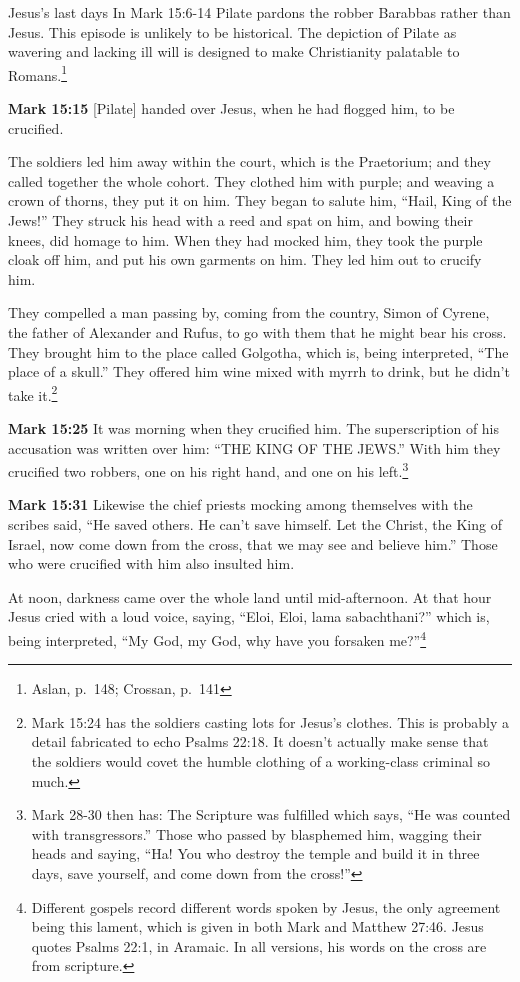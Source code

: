 \documentclass[10pt,twoside]{article} %
\newcommand{\doimage}[2]{\texttt{[image: \#2]}\label{fig:#2}}
\newcommand{\figbasic}[4]{ %
    \ifthenelse{\isodd{\pageref{fig:#2}}}{}{\hfill}
    \ifstrempty{#3}{
      \doimage{#1}{#2}
    }{
      \makebox{\doimage{#1}{#2} \\ #3}
    }
    \ifthenelse{\isodd{\pageref{fig:#2}}}{\hfill}{}
    \par
}
\newcommand{\fig}[2][0.4]{
  \figbasic{#1}{#2}{}{}
}
\newcommand{\quotesize}{\normalsize{}}
\newcommand{\comm}[1]{\begingroup \color{black!50} #1\endgroup}
\newenvironment{quotetext}{\begingroup\quotesize}{\endgroup}
\newcommand{\intex}[1]{\index[texts]{#1}}
\newcommand{\reftex}[1]{#1\intex{#1}}
\newcommand{\bible}[2]{\begin{quotetext}\textbf{#1}\intex{#1} #2\end{quotetext}}
\newcommand{\gospelmark}[2]{\bible{Mark #1}{#2}}
\begin{document}
\begin{section}{Jesus's last days}
\comm{In Mark 15:6-14 Pilate pardons the robber Barabbas rather than Jesus. This episode is unlikely to be historical.
The depiction of Pilate as wavering and lacking ill will is designed to make Christianity palatable to Romans.\footnote{Aslan, p.~148; Crossan,
p.~141}}

\fig{ecce-homo}

\gospelmark{15:15}{
[Pilate] handed over Jesus, when he had flogged him, to be crucified.

  The soldiers led him away within the court, which is the Praetorium; and they called together the whole cohort.   They clothed him with purple; and weaving a crown of thorns, they put it on him.   They began to salute him, ``Hail, King of the Jews!''   They struck his head with a reed and spat on him, and bowing their knees, did homage to him.   When they had mocked him, they took the purple cloak off him, and put his own garments on him. They led him out to crucify him.

  They compelled a man passing by, coming from the country, Simon of Cyrene, the father of Alexander and Rufus, to go with them that he might bear his cross.   They brought him to the place called Golgotha, which is, being interpreted, ``The place of a skull.''   They offered him wine mixed with myrrh to drink, but he didn't take it.\footnote{\reftex{Mark 15:24} has the soldiers casting lots for Jesus's clothes. This is probably a detail fabricated
to echo \reftex{Psalms 22:18}. It doesn't actually make sense that the soldiers would covet the humble clothing of a working-class criminal so much.}
}

\gospelmark{15:25}{
It was morning when they crucified him.   The superscription of his accusation was written over him: ``THE KING OF THE JEWS.''   With him they crucified two robbers, one on his right hand, and one on his left.\footnote{Mark 28-30 then has: The Scripture was fulfilled which says, 
``He was counted with transgressors.'' Those who passed by blasphemed him, wagging their heads and saying, ``Ha! You who destroy the temple and build it in three days,   save yourself, and come down from the cross!''}
}

\gospelmark{15:31}{
  Likewise the chief priests mocking among themselves with the scribes said, ``He saved others. He can't save himself.   Let the Christ, the King of Israel, now come down from the cross, that we may see and believe him.'' Those who were crucified with him also insulted him.

  At noon, darkness came over the whole land until mid-afternoon.   At that hour Jesus cried with a loud voice, saying, ``Eloi, Eloi, lama sabachthani?'' which is, being interpreted, ``My God, my God, why have
you forsaken me?''\footnote{Different gospels record different words spoken by Jesus, the only agreement being this lament, which is
given in both Mark and Matthew 27:46. Jesus quotes Psalms 22:1, in Aramaic. In all versions, his words on the cross are from scripture.}

}
\end{section}
\end{document}
